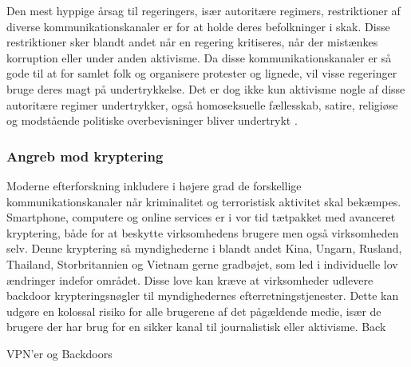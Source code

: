 Den mest hyppige årsag til regeringers, især autoritære regimers, restriktioner af diverse kommunikationskanaler er for at holde deres befolkninger i skak. Disse restriktioner sker blandt andet når en regering kritiseres, når der mistænkes korruption eller under anden aktivisme. Da disse kommunikationskanaler er så gode til at for samlet folk og organisere protester og lignede, vil visse regeringer bruge deres magt på undertrykkelse. Det er dog ikke kun aktivisme nogle af disse autoritære regimer undertrykker, også homoseksuelle fællesskab, satire, religiøse og modstående politiske overbevisninger bliver undertrykt \cite{FreedomHouseRapport2016}.

\subsubsection{Angreb mod kryptering}
Moderne efterforskning inkludere i højere grad de forskellige kommunikationskanaler når kriminalitet og terroristisk aktivitet skal bekæmpes. Smartphone, computere og online services er i vor tid tætpakket med avanceret kryptering, både for at beskytte virksomhedens brugere men også virksomheden selv. Denne kryptering så myndighederne i blandt andet Kina, Ungarn, Rusland, Thailand, Storbritannien og Vietnam gerne gradbøjet, som led i individuelle lov ændringer indefor området. Disse love kan kræve at virksomheder udlevere backdoor krypteringsnøgler til myndighedernes efterretningstjenester. Dette kan udgøre en kolossal risiko for alle brugerene af det pågældende medie, især de brugere der har brug for en sikker kanal til journalistisk eller aktivisme. Back

VPN'er og Backdoors
\cite{FreedomHouseRapport2017}
